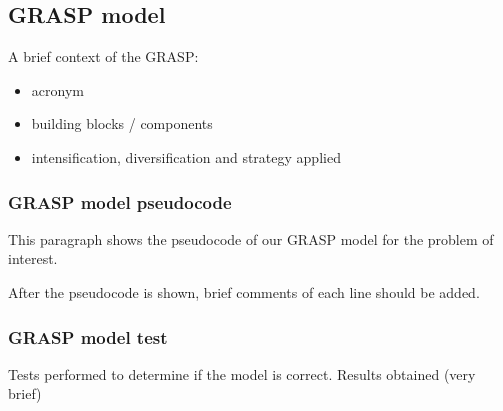 \subsection{GRASP model}

A brief context of the GRASP:
\begin{itemize}
	\item acronym
	\item building blocks / components
	\item intensification, diversification and strategy applied
\end{itemize}

\subsubsection{GRASP model pseudocode}

This paragraph shows the pseudocode of our GRASP model for the problem of interest.

After the pseudocode is shown, brief comments of each line should be added.



\subsubsection{GRASP model test}

Tests performed to determine if the model is correct. Results obtained (very brief)



\pagebreak